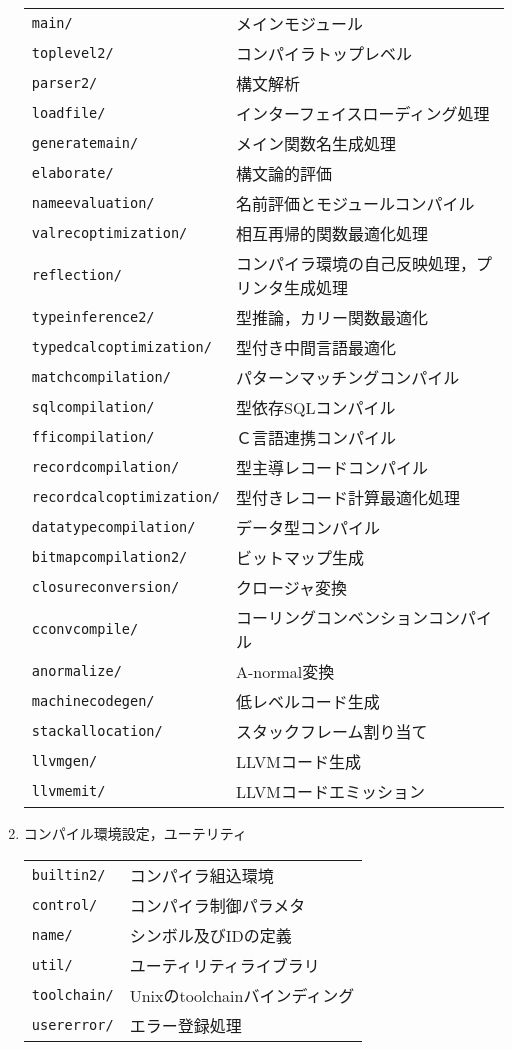 \documentclass{jbook}
\newcommand{\code}[1]{\mbox{\large\tt #1}}
\begin{document}
\begin{enumerate}
\begin{tabular}{ll}
\code{main/}& メインモジュール
\\
\code{toplevel2/}& コンパイラトップレベル
\\
\code{parser2/}& 構文解析
\\
\code{loadfile/}& インターフェイスローディング処理
\\
\code{generatemain/}& メイン関数名生成処理
\\
\code{elaborate/}& 構文論的評価
\\
\code{nameevaluation/}& 名前評価とモジュールコンパイル
\\
\code{valrecoptimization/}& 相互再帰的関数最適化処理
\\
\code{reflection/}& コンパイラ環境の自己反映処理，プリンタ生成処理
\\
\code{typeinference2/}& 型推論，カリー関数最適化
\\
\code{typedcalcoptimization/}& 型付き中間言語最適化
\\
\code{matchcompilation/}& パターンマッチングコンパイル
\\
\code{sqlcompilation/}& 型依存SQLコンパイル
\\
\code{fficompilation/}&  Ｃ言語連携コンパイル
\\
\code{recordcompilation/}& 型主導レコードコンパイル
\\
\code{recordcalcoptimization/}& 型付きレコード計算最適化処理
\\
\code{datatypecompilation/}& データ型コンパイル
\\
\code{bitmapcompilation2/}& ビットマップ生成
\\
\code{closureconversion/}& クロージャ変換
\\
\code{cconvcompile/}& コーリングコンベンションコンパイル
\\
\code{anormalize/}& A-normal変換
\\
\code{machinecodegen/}&  低レベルコード生成
\\
\code{stackallocation/}& スタックフレーム割り当て
\\
\code{llvmgen/}& LLVMコード生成
\\
\code{llvmemit/}& LLVMコードエミッション
\end{tabular}

\item コンパイル環境設定，ユーテリティ

\begin{tabular}{ll}
\code{builtin2/}& コンパイラ組込環境
\\
\code{control/}& コンパイラ制御パラメタ
\\
\code{name/}& シンボル及びIDの定義
\\
\code{util/}& ユーティリティライブラリ
\\
\code{toolchain/}& Unixのtoolchainバインディング
\\
\code{usererror/}& エラー登録処理
\end{tabular}


\end{enumerate}
\end{document}
